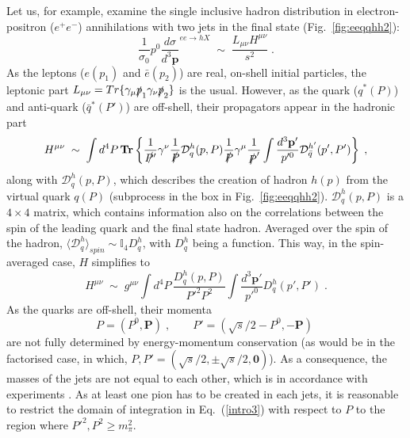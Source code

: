 \documentclass{PoS}
\newcommand{\be}{\begin{equation}}
\newcommand{\ee}[1]{\label{#1} \end{equation}}
\begin{document}
Let us, for example, examine the single inclusive hadron distribution in electron-positron ($e^+e^-$) annihilations with two jets in the final state (Fig.~\ref{fig:eeqqhh2}): 
\be
\frac{1}{\sigma_0} p^0\frac{d\sigma}{d^3\mathbf{p}}^{ee\rightarrow hX} \;\sim\; \frac{L_{\mu\nu} H^{\mu\nu}}{s^2} \;.
\ee{intro1}
As the leptons ($e(p_1)$ and $\bar{e}(p_2)$) are real, on-shell initial particles, the leptonic part $L_{\mu\nu} = Tr\lbrace \gamma_\mu \slashed{p}_1\gamma_\nu \slashed{p}_2\rbrace$ is the usual. However, as the quark ($q^\ast(P)$) and anti-quark ($\bar{q}^\ast(P')$) are off-shell, their propagators appear in the hadronic part 
\be
H^{\mu\nu} \;\sim\; \int d^4 P \, \mathbf{Tr}\left\lbrace \frac{1}{\slashed{P'}} \gamma^\nu \frac{1}{\slashed{P}} \mathcal{D}^h_q(p,P) \frac{1}{\slashed{P}} \gamma^\mu \frac{1}{\slashed P'} \int \frac{d^3\mathbf{p'}}{p'^0}\mathcal{D}^{h'}_{\bar q}(p',P') \right\rbrace \;,
\ee{intro2}
along with $\mathcal{D}^h_q(p,P)$, which describes the creation of hadron $h(p)$ from the virtual quark $q(P)$ (subprocess in the box in Fig.~\ref{fig:eeqqhh2}). $\mathcal{D}^h_q(p,P)$ is a $4\times4$ matrix, which contains information also on the correlations between the spin of the leading quark and the final state hadron. Averaged over the spin of the hadron, $\langle \mathcal D_q^h \rangle_{spin} \sim \mathbb{I}_4 D_q^h$, with $D_q^h$ being a function. This way, in the spin-averaged case, $H$ simplifies to
\be
H^{\mu\nu} \;\sim\;  g^{\mu\nu} \int d^4 P \, \frac{D^h_q(p,P)}{P'^2 P^2}    \int \frac{d^3\mathbf{p'}}{p'^0} D^h_q(p',P') \;. 
\ee{intro3}
As the quarks are off-shell, their momenta 
\be
P  = \left(P^0, \mathbf P\right) \;,\qquad P' = \left(\sqrt s/2 - P^0,- \mathbf P\right)\;
\ee{intro4}
are not fully determined by energy-momentum conservation (as would be in the factorised case, in which, $P,P' = \left(\sqrt s/2,\pm \sqrt s/2,\mathbf 0\right)$). As a consequence, the masses of the jets are not equal to each other, which is in accordance with experiments \cite{bib:jetmass}. As at least one pion has to be created in each jets, it is reasonable to restrict the domain of integration in Eq.~(\ref{intro3}) with respect to $P$ to the region where $P'^2, P^2 \geq m_\pi^2$.


\end{document}
